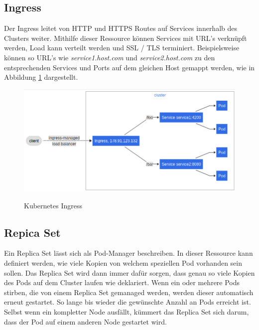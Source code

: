 \subsection{Ingress}
Der Ingress leitet von \ac{HTTP} und \ac{HTTPS} Routes auf Services innerhalb des Clusters weiter.
Mithilfe dieser Ressource können Services mit \ac{URL}'s verknüpft werden, Load kann verteilt werden und \ac{SSL} / \ac{TLS} terminiert.
Beispielsweise können so \ac{URL}'s wie \textit{service1.host.com} und \textit{service2.host.com} zu den entsprechenden Services und Ports auf dem gleichen Host gemappt werden, wie in Abbildung \ref{fig:ingress} dargestellt.
\cite{kubernetes_ingress}
\begin{figure}[h]
        \caption{Kubernetes Ingress\cite{kubernetes_ingress}}
        \centering
        \includegraphics[width=\textwidth]{bilder/kubernetes_ingress.png}
        \label{fig:ingress}
\end{figure}

\subsection{Repica Set}
Ein Replica Set lässt sich als Pod-Manager beschreiben. 
In dieser Ressource kann definiert werden, wie viele Kopien von welchem speziellen Pod vorhanden sein sollen.
Das Replica Set wird dann immer dafür sorgen, dass genau so viele Kopien des Pods auf dem Cluster laufen wie deklariert. 
Wenn ein oder mehrere Pods stirben, die von einem Replica Set gemanaged werden, werden dieser automatisch erneut gestartet. 
So lange bis wieder die gewünschte Anzahl an Pods erreicht ist.
Selbst wenn ein kompletter Node ausfällt, kümmert das Replica Set sich darum, dass der Pod auf einem anderen Node gestartet wird.
\cite[S.103 ff.]{Kubernetes_up_and_running}

